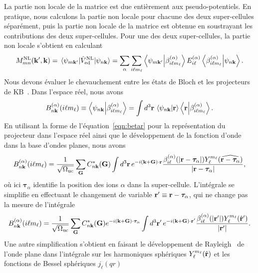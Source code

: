 La partie non locale de la matrice est due entièrement aux pseudo-potentiels. En pratique, nous calculons la partie non locale pour chacune des deux super-cellules séparément, puis la partie non locale de la matrice est obtenue en soustrayant les contributions des deux super-cellules. Pour une des deux super-cellules, la partie non locale s'obtient en calculant
\begin{equation}
    M_{mn}^\text{NL}(\kv',\kv) = \matrixel{\psi_{m\kv'}}{\hat{V}_\text{ed}^\text{NL}}{\psi_{n\kv}} = \sum_\alpha\sum_{i\ell m_\ell}\braket{\psi_{m\kv'}}{\beta^{(\alpha)}_{i\ell m_\ell}}E_{i\ell}^{(\alpha)}\braket{\beta^{(\alpha)}_{i\ell m_\ell}}{\psi_{n\kv}}.\label{eqn:M_NL}
\end{equation}
Nous devons évaluer le chevauchement entre les états de Bloch et les projecteurs de KB~\cite{kleinmanEfficaciousFormModel1982}. Dans l'espace réel, nous avons
\begin{equation}
    B_{n\mathbf{k}}^{(\alpha)}(i\ell m_\ell)\equiv\braket{\psi_{n\mathbf{k}}}{\beta_{i\ell m_\ell}^{(\alpha)}} = \int d^3\mathbf{r}\,\braket{\psi_{n\mathbf{k}}}{\mathbf{r}}\braket{\mathbf{r}}{\beta_{i\ell m_\ell}^{(\alpha)}}.
\end{equation}
En utilisant la forme de l'équation~\eqref{eqn:betar} pour la représentation du projecteur dans l'espace réel ainsi que le développement de la fonction d'onde dans la base d'ondes planes, nous avons
\begin{equation}
    B_{n\mathbf{k}}^{(\alpha)}(i\ell m_\ell) =\frac{1}{\sqrt{\Omega_\text{uc}}}\sum_{\mathbf{G}} C^*_{n\mathbf{k}}(\mathbf{G})\int d^3\mathbf{r}\,e^{-i(\mathbf{k}+\mathbf{G})\cdot\mathbf{r}}\frac{\beta_{i\ell}^{(\alpha)}(|\mathbf{r}-\bm{\tau}_\alpha|)Y_\ell^{m_\ell}(\widehat{\mathbf{r}-\bm{\tau}_\alpha})}{|\mathbf{r}-\bm{\tau}_\alpha|},
\end{equation}
où ici $\bm{\tau}_\alpha$ identifie la position des ions $\alpha$ dans la super-cellule. L'intégrale se simplifie en effectuant le changement de variable $\mathbf{r}'\equiv\mathbf{r}-\bm{\tau}_\alpha$, qui ne change pas la mesure de l'intégrale
\begin{equation}
    B_{n\mathbf{k}}^{(\alpha)}(i\ell m_\ell) =\frac{1}{\sqrt{\Omega_\text{uc}}}\sum_{\mathbf{G}} C^*_{n\mathbf{k}}(\mathbf{G})e^{-i(\mathbf{k}+\mathbf{G})\cdot\bm{\tau}_{\alpha}}\int d^3\mathbf{r}'\, e^{-i(\mathbf{k}+\mathbf{G})\cdot\mathbf{r}'}\frac{\beta_{i\ell}^{(\alpha)}(|\mathbf{r}'|)Y_\ell^{m_\ell}(\hat{\mathbf{r}}')}{|\mathbf{r}'|}.
\end{equation}
Une autre simplification s'obtient en faisant le développement de Rayleigh~\cite{arfkenMathematicalMethodsPhysicists2013} de l'onde plane dans l'intégrale sur les harmoniques sphériques $Y_\ell^{m_\ell}(\hat{\mathbf{r}})$ et les fonctions de Bessel sphériques $j_\ell(qr)$
